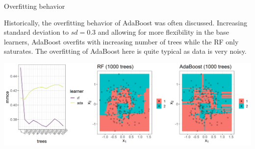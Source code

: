 \begin{vbframe}{Overfitting behavior}

Historically, the overfitting behavior of AdaBoost was often discussed.
Increasing standard deviation to $sd = 0.3$ and allowing for more flexibility in 
the base learners, AdaBoost overfits with increasing number of trees while the 
RF only saturates.
The overfitting of AdaBoost here is quite typical as data is very noisy.

\vfill

\includegraphics[width=\textwidth]{figure/stump_plots_noisy.png}

\end{vbframe}









